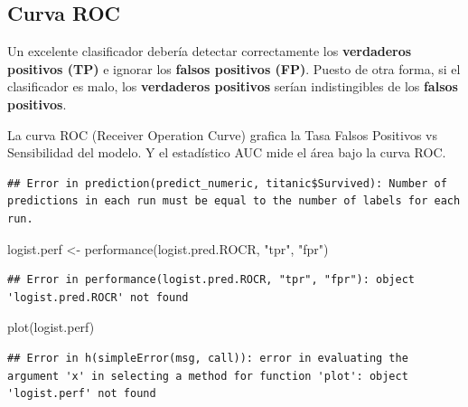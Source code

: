 \documentclass[
  12pt,
]{book}
\newenvironment{Shaded}{\begin{snugshade}}{\end{snugshade}}
\newcommand{\FunctionTok}[1]{\textcolor[rgb]{0.00,0.00,0.00}{#1}}
\newcommand{\NormalTok}[1]{#1}
\newcommand{\OtherTok}[1]{\textcolor[rgb]{0.56,0.35,0.01}{#1}}
\newcommand{\SpecialCharTok}[1]{\textcolor[rgb]{0.00,0.00,0.00}{#1}}
\newcommand{\StringTok}[1]{\textcolor[rgb]{0.31,0.60,0.02}{#1}}
\theoremstyle{definition}
\theoremstyle{definition}
\theoremstyle{definition}
\theoremstyle{definition}
\theoremstyle{remark}
\begin{document}
\hypertarget{curva-roc}{%
\subsection{Curva ROC}\label{curva-roc}}

Un excelente clasificador debería detectar correctamente los \textbf{verdaderos positivos (TP)} e ignorar los \textbf{falsos positivos (FP)}. Puesto de otra forma, si el clasificador es malo, los \textbf{verdaderos positivos} serían indistingibles de los \textbf{falsos positivos}.

La curva ROC (Receiver Operation Curve) grafica la Tasa Falsos Positivos vs Sensibilidad del modelo. Y el estadístico AUC mide el área bajo la curva ROC.

\begin{Shaded}
\end{Shaded}

\begin{verbatim}
## Error in prediction(predict_numeric, titanic$Survived): Number of predictions in each run must be equal to the number of labels for each run.
\end{verbatim}

\begin{Shaded}
\begin{Highlighting}[]
\NormalTok{logist.perf }\OtherTok{\textless{}{-}} \FunctionTok{performance}\NormalTok{(logist.pred.ROCR, }\StringTok{"tpr"}\NormalTok{,}
    \StringTok{"fpr"}\NormalTok{)}
\end{Highlighting}
\end{Shaded}

\begin{verbatim}
## Error in performance(logist.pred.ROCR, "tpr", "fpr"): object 'logist.pred.ROCR' not found
\end{verbatim}

\begin{Shaded}
\begin{Highlighting}[]
\FunctionTok{plot}\NormalTok{(logist.perf)}
\end{Highlighting}
\end{Shaded}

\begin{verbatim}
## Error in h(simpleError(msg, call)): error in evaluating the argument 'x' in selecting a method for function 'plot': object 'logist.perf' not found
\end{verbatim}
\end{document}
